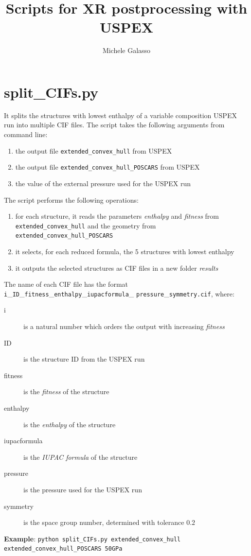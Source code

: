 \documentclass{article}
\begin{document}
\title{Scripts for XR postprocessing with USPEX}
\author{Michele Galasso}

\maketitle


\section{split\_CIFs.py}
It splits the structures with lowest enthalpy of a variable composition USPEX run into multiple CIF files. The script takes the following arguments from command line:
\begin{enumerate}
	\item the output file \texttt{extended\_convex\_hull} from USPEX
	\item the output file \texttt{extended\_convex\_hull\_POSCARS} from USPEX
	\item the value of the external pressure used for the USPEX run
\end{enumerate}
The script performs the following operations:
\begin{enumerate}
	\item for each structure, it reads the parameters \emph{enthalpy} and \emph{fitness} from \texttt{extended\_convex\_hull} and the geometry from \texttt{extended\_convex\_hull\_POSCARS}
	\item it selects, for each reduced formula, the 5 structures with lowest enthalpy
	\item it outputs the selected structures as CIF files in a new folder \textit{results}
\end{enumerate}
The name of each CIF file has the format \texttt{i}\_\texttt{ID}\_\texttt{fitness}\_\texttt{enthalpy}\_\texttt{iupacformula}\_ \texttt{pressure}\_\texttt{symmetry.cif}, where:
\begin{description}
	\item[i] is a natural number which orders the output with increasing \emph{fitness}
	\item[ID] is the structure ID from the USPEX run
	\item[fitness] is the \emph{fitness} of the structure
	\item[enthalpy] is the \emph{enthalpy} of the structure
	\item[iupacformula] is the \emph{IUPAC formula} of the structure
	\item[pressure] is the pressure used for the USPEX run
	\item[symmetry] is the space group number, determined with tolerance $0.2$\end{description}
\textbf{Example}: \texttt{python split\_CIFs.py extended\_convex\_hull \\ extended\_convex\_hull\_POSCARS 50GPa}
\end{document}
